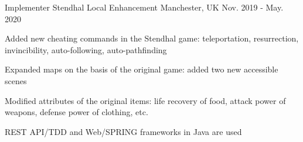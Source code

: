\begin{cventries}
  \cventry
    {Implementer} %
    {Stendhal Local Enhancement} %
    {Manchester, UK} %
    {Nov. 2019 - May. 2020} %
    {
      \begin{cvitems} %
        \item {Added new cheating commands in the Stendhal game: teleportation, resurrection, invincibility, auto-following, auto-pathfinding}
        \item {Expanded maps on the basis of the original game: added two new accessible scenes}
        \item {Modified attributes of the original items: life recovery of food, attack power of weapons, defense power of clothing, etc.}
        \item {REST API/TDD and Web/SPRING frameworks in Java are used}
      \end{cvitems}
    }

\end{cventries}
